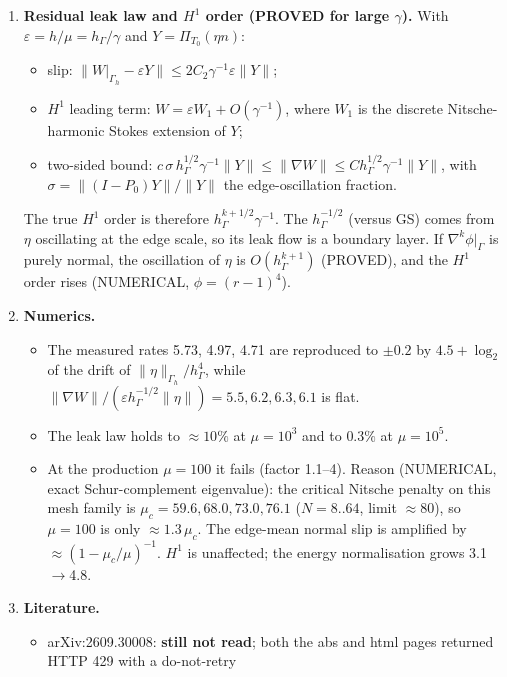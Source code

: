 \documentclass[11pt]{article}
\theoremstyle{remark}
\newcommand{\hG}{h_\Gamma}
\newcommand{\Gh}{\Gamma_h}
\newcommand{\ip}[2]{\langle #1,#2\rangle}
\begin{document}
\begin{enumerate}
\begin{itemize}
 via an exact Rodrigues identity $\ip{\eta}{L_k}_e=|e|^{k+1}\tfrac{k!}{(2k+1)!}\,\mathrm{avg}_{\beta}(\partial_{\tau_e}^k\phi)$,
 which does not depend on the triangle shape. For odd $k$ this route provably fails (continuity at vertices forces
 alternating signs).
 \end{itemize}
\item \textbf{Residual leak law and $H^1$ order (PROVED for large $\gamma$).} With $\varepsilon=h/\mu=\hG/\gamma$ and
$Y=\Pi_{T_0}(\eta n)$:
 \begin{itemize}
 \item slip: $\|W|_{\Gh}-\varepsilon Y\|\le 2C_2\gamma^{-1}\varepsilon\|Y\|$;
 \item $H^1$ leading term: $W=\varepsilon W_1+O(\gamma^{-1})$, where $W_1$ is the discrete Nitsche-harmonic Stokes extension
 of $Y$;
 \item two-sided bound: $c\,\sigma\, \hG^{1/2}\gamma^{-1}\|Y\|\le\|\nabla W\|\le C\hG^{1/2}\gamma^{-1}\|Y\|$, with
 $\sigma=\|(I-P_0)Y\|/\|Y\|$ the edge-oscillation fraction.
 \end{itemize}
The true $H^1$ order is therefore $\hG^{k+1/2}\gamma^{-1}$. The $\hG^{-1/2}$ (versus GS) comes from $\eta$ oscillating at the
edge scale, so its leak flow is a boundary layer. If $\nabla^k\phi|_\Gamma$ is purely normal, the oscillation of $\eta$ is
$O(\hG^{k+1})$ (PROVED), and the $H^1$ order rises (NUMERICAL, $\phi=(r-1)^4$).
\item \textbf{Numerics.}
 \begin{itemize}
 \item The measured rates 5.73, 4.97, 4.71 are reproduced to $\pm0.2$ by $4.5+\log_2$ of the drift of $\|\eta\|_{\Gh}/\hG^4$,
 while $\|\nabla W\|/(\varepsilon\hG^{-1/2}\|\eta\|)=5.5,6.2,6.3,6.1$ is flat.
 \item The leak law holds to $\approx10\%$ at $\mu=10^3$ and to $0.3\%$ at $\mu=10^5$.
 \item At the production $\mu=100$ it fails (factor 1.1--4). Reason (NUMERICAL, exact Schur-complement eigenvalue): the
 critical Nitsche penalty on this mesh family is $\mu_c=59.6,68.0,73.0,76.1$ ($N=8..64$, limit $\approx 80$), so $\mu=100$
 is only $\approx1.3\,\mu_c$. The edge-mean normal slip is amplified by $\approx(1-\mu_c/\mu)^{-1}$. $H^1$ is unaffected;
 the energy normalisation grows 3.1$\to$4.8.
 \end{itemize}
\item \textbf{Literature.}
 \begin{itemize}
 \item arXiv:2609.30008: \textbf{still not read}; both the abs and html pages returned HTTP 429 with a do-not-retry

\end{itemize}
\end{enumerate}
\end{document}
